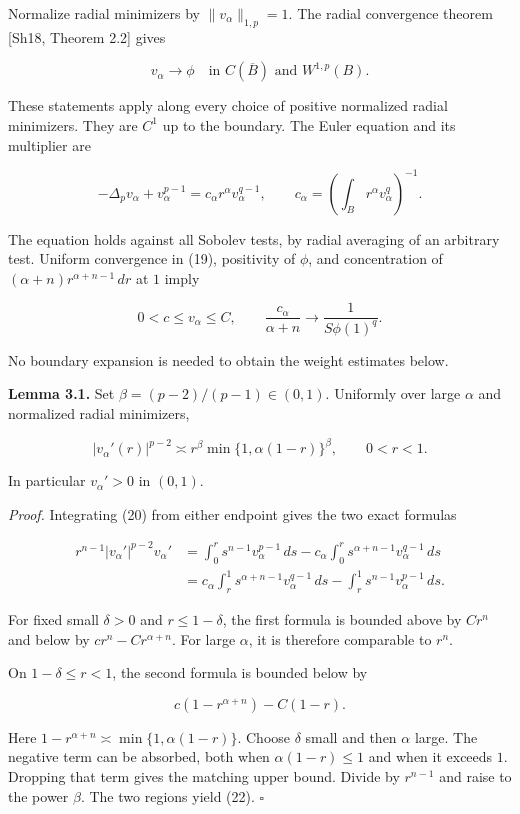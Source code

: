 \documentclass[11pt]{article}
\begin{document}
Normalize radial minimizers by \(\|v_\alpha\|_{1,p}=1\). The radial
convergence theorem {[}Sh18, Theorem 2.2{]} gives

\[
v_\alpha\longrightarrow\phi\quad\text{in }C(\overline B)\text{ and }W^{1,p}(B).
\tag{19}
\]

These statements apply along every choice of positive normalized radial
minimizers. They are \(C^1\) up to the boundary. The Euler equation and
its multiplier are

\[
-\Delta_pv_\alpha+v_\alpha^{p-1}
 =c_\alpha r^\alpha v_\alpha^{q-1},\qquad
c_\alpha=\left(\int_Br^\alpha v_\alpha^q\right)^{-1}.
\tag{20}
\]

The equation holds against all Sobolev tests, by radial averaging of an
arbitrary test. Uniform convergence in (19), positivity of \(\phi\), and
concentration of \((\alpha+n)r^{\alpha+n-1}\,dr\) at \(1\) imply

\[
0<c\le v_\alpha\le C,\qquad
\frac{c_\alpha}{\alpha+n}\longrightarrow\frac1{S\phi(1)^q}.
\tag{21}
\]

No boundary expansion is needed to obtain the weight estimates below.

\textbf{Lemma 3.1.} Set \(\beta=(p-2)/(p-1)\in(0,1)\). Uniformly over
large \(\alpha\) and normalized radial minimizers,

\[
|v_\alpha'(r)|^{p-2}\asymp
r^\beta\min\{1,\alpha(1-r)\}^\beta,
\qquad0<r<1.
\tag{22}
\]

In particular \(v_\alpha'>0\) in \((0,1)\).

\emph{Proof.} Integrating (20) from either endpoint gives the two exact
formulas

\[
\begin{aligned}
 r^{n-1}|v_\alpha'|^{p-2}v_\alpha'
 &=\int_0^rs^{n-1}v_\alpha^{p-1}\,ds
  -c_\alpha\int_0^rs^{\alpha+n-1}v_\alpha^{q-1}\,ds\\
 &=c_\alpha\int_r^1s^{\alpha+n-1}v_\alpha^{q-1}\,ds
  -\int_r^1s^{n-1}v_\alpha^{p-1}\,ds.
\end{aligned}
\tag{23}
\]

For fixed small \(\delta>0\) and \(r\le1-\delta\), the first formula is
bounded above by \(Cr^n\) and below by \(cr^n-Cr^{\alpha+n}\). For large
\(\alpha\), it is therefore comparable to \(r^n\).

On \(1-\delta\le r<1\), the second formula is bounded below by

\[
c(1-r^{\alpha+n})-C(1-r).
\]

Here \(1-r^{\alpha+n}\asymp\min\{1,\alpha(1-r)\}\). Choose \(\delta\)
small and then \(\alpha\) large. The negative term can be absorbed, both
when \(\alpha(1-r)\le1\) and when it exceeds \(1\). Dropping that term
gives the matching upper bound. Divide by \(r^{n-1}\) and raise to the
power \(\beta\). The two regions yield (22). \(\square\)
\end{document}
